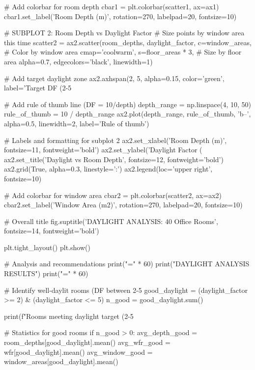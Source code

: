 {    # Add colorbar for room depth
    cbar1 = plt.colorbar(scatter1, ax=ax1)
    cbar1.set_label('Room Depth (m)', rotation=270, labelpad=20, fontsize=10)
    
    # SUBPLOT 2: Room Depth vs Daylight Factor
    # Size points by window area this time
    scatter2 = ax2.scatter(room_depths, daylight_factor,
                          c=window_areas,  # Color by window area
                          cmap='coolwarm',
                          s=floor_areas * 3,  # Size by floor area
                          alpha=0.7,
                          edgecolors='black',
                          linewidth=1)
    
    # Add target daylight zone
    ax2.axhspan(2, 5, alpha=0.15, color='green', label='Target DF (2-5%
    
    # Add rule of thumb line (DF = 10/depth)
    depth_range = np.linspace(4, 10, 50)
    rule_of_thumb = 10 / depth_range
    ax2.plot(depth_range, rule_of_thumb, 'b--', alpha=0.5,
             linewidth=2, label='Rule of thumb')
    
    # Labels and formatting for subplot 2
    ax2.set_xlabel('Room Depth (m)', fontsize=11, fontweight='bold')
    ax2.set_ylabel('Daylight Factor (%
    ax2.set_title('Daylight vs Room Depth', fontsize=12, fontweight='bold')
    ax2.grid(True, alpha=0.3, linestyle=':')
    ax2.legend(loc='upper right', fontsize=10)
    
    # Add colorbar for window area
    cbar2 = plt.colorbar(scatter2, ax=ax2)
    cbar2.set_label('Window Area (m2)', rotation=270, labelpad=20, fontsize=10)
    
    # Overall title
    fig.suptitle('DAYLIGHT ANALYSIS: 40 Office Rooms', 
                 fontsize=14, fontweight='bold')
    
    plt.tight_layout()
    plt.show()
    
    # Analysis and recommendations
    print("=" * 60)
    print("DAYLIGHT ANALYSIS RESULTS")
    print("=" * 60)
    
    # Identify well-daylit rooms (DF between 2-5%
    good_daylight = (daylight_factor >= 2) & (daylight_factor <= 5)
    n_good = good_daylight.sum()
    
    print(f"Rooms meeting daylight target (2-5%
    
    # Statistics for good rooms
    if n_good > 0:
        avg_depth_good = room_depths[good_daylight].mean()
        avg_wfr_good = wfr[good_daylight].mean()
        avg_window_good = window_areas[good_daylight].mean()
        
}
